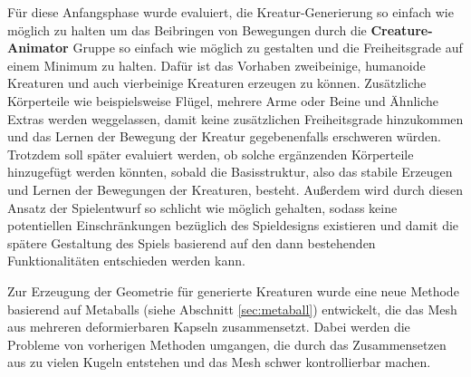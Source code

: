 Für diese Anfangsphase wurde evaluiert, die Kreatur-Generierung so einfach wie möglich zu halten um das Beibringen von Bewegungen durch die \textbf{Creature-Animator} Gruppe so einfach wie möglich zu gestalten und die Freiheitsgrade auf einem Minimum zu halten. Dafür ist das Vorhaben zweibeinige, humanoide Kreaturen und auch vierbeinige Kreaturen erzeugen zu können. Zusätzliche Körperteile wie beispielsweise Flügel, mehrere Arme oder Beine und Ähnliche Extras werden weggelassen, damit keine zusätzlichen Freiheitsgrade hinzukommen und das Lernen der Bewegung der Kreatur gegebenenfalls erschweren würden. Trotzdem soll später evaluiert werden, ob solche ergänzenden Körperteile hinzugefügt werden könnten, sobald die Basisstruktur, also das stabile Erzeugen und Lernen der Bewegungen der Kreaturen, besteht. Außerdem wird durch diesen Ansatz der Spielentwurf so schlicht wie möglich gehalten, sodass keine potentiellen Einschränkungen bezüglich des Spieldesigns existieren und damit die spätere Gestaltung des Spiels basierend auf den dann bestehenden Funktionalitäten entschieden werden kann. 

Zur Erzeugung der Geometrie für generierte Kreaturen wurde eine neue Methode basierend auf Metaballs (siehe Abschnitt \ref{sec:metaball}) entwickelt, die das Mesh aus mehreren deformierbaren Kapseln zusammensetzt. Dabei werden die Probleme von vorherigen Methoden umgangen, die durch das Zusammensetzen aus zu vielen Kugeln entstehen und das Mesh schwer kontrollierbar machen.

